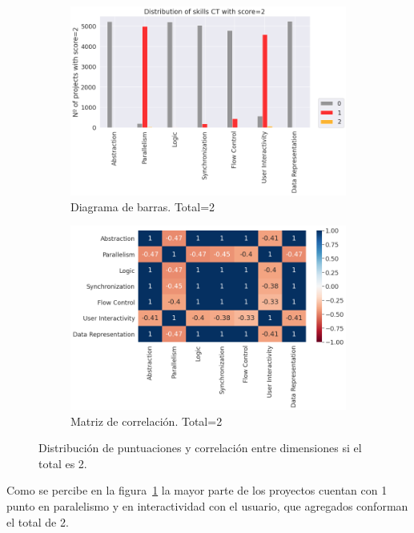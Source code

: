 \documentclass[a4paper, 12pt]{book}
\begin{document}
\begin{figure}[H]
    \centering
    \begin{subfigure}[h]{.49\textwidth} 
        \includegraphics[width=\textwidth]{img/distribucion_2_Scratch}
        \caption{Diagrama de barras. Total=2}
        \label{fig:total2}
    \end{subfigure}       
    \begin{subfigure}[h]{.49\textwidth} 
        \includegraphics[width=\textwidth]{img/corr_2_Scratch}
        \caption{Matriz de correlación. Total=2}
        \label{fig:corr2}
    \end{subfigure}
     \caption{Distribución de puntuaciones y correlación entre dimensiones si el total es 2.}
\end{figure}

Como se percibe en la figura~\ref{fig:total2} la mayor parte de los proyectos cuentan con 1 punto en paralelismo y en interactividad con el usuario, que agregados conforman el total de 2.
\end{document}
